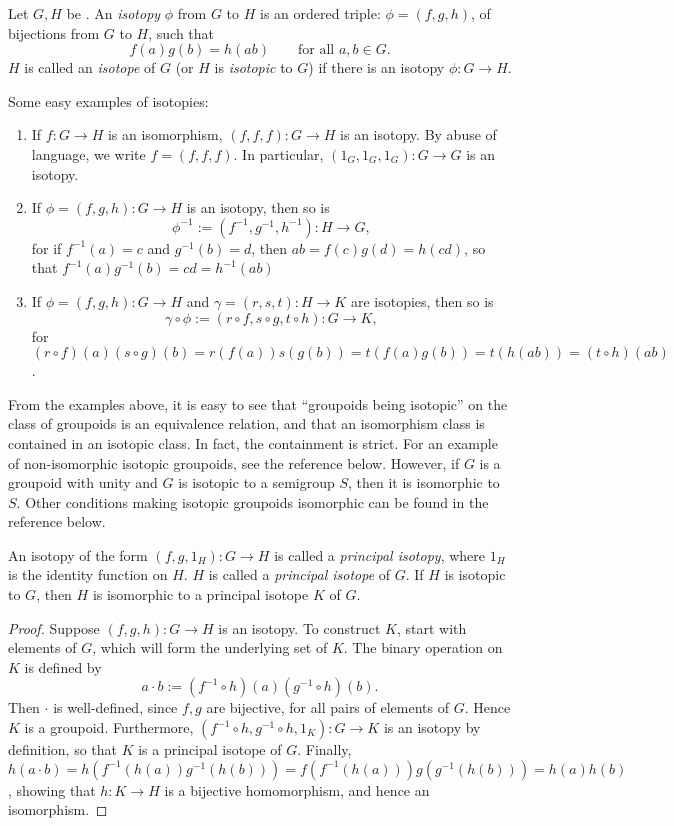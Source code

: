 \documentclass[12pt]{article}
\begin{document}
Let $G,H$ be .  An \emph{isotopy} $\phi$ from $G$ to $H$ is an ordered triple: $\phi=(f,g,h)$, of bijections from $G$ to $H$, such that $$f(a)g(b)=h(ab)\qquad \mbox{for all } a,b\in G.$$
$H$ is called an \emph{isotope} of $G$ (or $H$ is \emph{isotopic} to $G$) if there is an isotopy $\phi:G\to H$.

Some easy examples of isotopies: 
\begin{enumerate}
\item If $f:G\to H$ is an isomorphism, $(f,f,f):G\to H$ is an isotopy.  By abuse of language, we write $f=(f,f,f)$.  In particular, $(1_G,1_G,1_G):G\to G$ is an isotopy.
\item If $\phi=(f,g,h):G\to H$ is an isotopy, then so is $$\phi^{-1}:=(f^{-1},g^{-1},h^{-1}):H\to G,$$  for if $f^{-1}(a)=c$ and $g^{-1}(b)=d$, then $ab=f(c)g(d)=h(cd)$, so that $f^{-1}(a)g^{-1}(b)=cd=h^{-1}(ab)$
\item If $\phi=(f,g,h):G\to H$ and $\gamma=(r,s,t):H\to K$ are isotopies, then so is $$\gamma\circ \phi:=(r\circ f, s\circ g, t\circ h):G\to K,$$ for $(r\circ f)(a)(s\circ g)(b)=r(f(a))s(g(b))=t(f(a)g(b))=t(h(ab))=(t\circ h)(ab)$.
\end{enumerate}

From the examples above, it is easy to see that ``groupoids being isotopic'' on the class of groupoids is an equivalence relation, and that an isomorphism class is contained in an isotopic class.  In fact, the containment is strict.  For an example of non-isomorphic isotopic groupoids, see the reference below.  However, if $G$ is a groupoid with unity and $G$ is isotopic to a semigroup $S$, then it is isomorphic to $S$.  Other conditions making isotopic groupoids isomorphic can be found in the reference below.

An isotopy of the form $(f,g,1_H):G\to H$ is called a \emph{principal isotopy}, where $1_H$ is the identity function on $H$.  $H$ is called a \emph{principal isotope} of $G$.  If $H$ is isotopic to $G$, then $H$ is isomorphic to a principal isotope $K$ of $G$.  
\begin{proof}
Suppose $(f,g,h):G\to H$ is an isotopy.  To construct $K$, start with elements of $G$, which will form the underlying set of $K$.  The binary operation on $K$ is defined by $$a\cdot b:= (f^{-1}\circ h)(a)(g^{-1}\circ h)(b).$$
Then $\cdot$ is well-defined, since $f,g$ are bijective, for all pairs of elements of $G$.  Hence $K$ is a groupoid.  Furthermore, $(f^{-1}\circ h,g^{-1}\circ h,1_K):G\to K$ is an isotopy by definition, so that $K$ is a principal isotope of $G$.  Finally, $h(a\cdot b)=h(f^{-1}(h(a))g^{-1}(h(b)))=f(f^{-1}(h(a)))g(g^{-1}(h(b)))=h(a)h(b)$, showing that $h:K\to H$ is a bijective homomorphism, and hence an isomorphism.
\end{proof}
\end{document}

